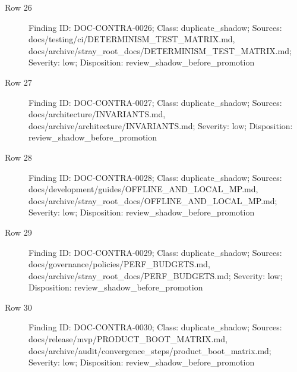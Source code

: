 \documentclass[9pt,a4paper]{book}
\begin{document}
\begin{description}
\item[Row 26] Finding ID: DOC-\allowbreak{}CONTRA-\allowbreak{}0026; Class: duplicate\_\allowbreak{}shadow; Sources: docs/\allowbreak{}testing/\allowbreak{}ci/\allowbreak{}DETERMINISM\_\allowbreak{}TEST\_\allowbreak{}MATRIX.\allowbreak{}md, docs/\allowbreak{}archive/\allowbreak{}stray\_\allowbreak{}root\_\allowbreak{}docs/\allowbreak{}DETERMINISM\_\allowbreak{}TEST\_\allowbreak{}MATRIX.\allowbreak{}md; Severity: low; Disposition: review\_\allowbreak{}shadow\_\allowbreak{}before\_\allowbreak{}promotion
\item[Row 27] Finding ID: DOC-\allowbreak{}CONTRA-\allowbreak{}0027; Class: duplicate\_\allowbreak{}shadow; Sources: docs/\allowbreak{}architecture/\allowbreak{}INVARIANTS.\allowbreak{}md, docs/\allowbreak{}archive/\allowbreak{}architecture/\allowbreak{}INVARIANTS.\allowbreak{}md; Severity: low; Disposition: review\_\allowbreak{}shadow\_\allowbreak{}before\_\allowbreak{}promotion
\item[Row 28] Finding ID: DOC-\allowbreak{}CONTRA-\allowbreak{}0028; Class: duplicate\_\allowbreak{}shadow; Sources: docs/\allowbreak{}development/\allowbreak{}guides/\allowbreak{}OFFLINE\_\allowbreak{}AND\_\allowbreak{}LOCAL\_\allowbreak{}MP.\allowbreak{}md, docs/\allowbreak{}archive/\allowbreak{}stray\_\allowbreak{}root\_\allowbreak{}docs/\allowbreak{}OFFLINE\_\allowbreak{}AND\_\allowbreak{}LOCAL\_\allowbreak{}MP.\allowbreak{}md; Severity: low; Disposition: review\_\allowbreak{}shadow\_\allowbreak{}before\_\allowbreak{}promotion
\item[Row 29] Finding ID: DOC-\allowbreak{}CONTRA-\allowbreak{}0029; Class: duplicate\_\allowbreak{}shadow; Sources: docs/\allowbreak{}governance/\allowbreak{}policies/\allowbreak{}PERF\_\allowbreak{}BUDGETS.\allowbreak{}md, docs/\allowbreak{}archive/\allowbreak{}stray\_\allowbreak{}root\_\allowbreak{}docs/\allowbreak{}PERF\_\allowbreak{}BUDGETS.\allowbreak{}md; Severity: low; Disposition: review\_\allowbreak{}shadow\_\allowbreak{}before\_\allowbreak{}promotion
\item[Row 30] Finding ID: DOC-\allowbreak{}CONTRA-\allowbreak{}0030; Class: duplicate\_\allowbreak{}shadow; Sources: docs/\allowbreak{}release/\allowbreak{}mvp/\allowbreak{}PRODUCT\_\allowbreak{}BOOT\_\allowbreak{}MATRIX.\allowbreak{}md, docs/\allowbreak{}archive/\allowbreak{}audit/\allowbreak{}convergence\_\allowbreak{}steps/\allowbreak{}product\_\allowbreak{}boot\_\allowbreak{}matrix.\allowbreak{}md; Severity: low; Disposition: review\_\allowbreak{}shadow\_\allowbreak{}before\_\allowbreak{}promotion

\end{description}
\end{document}
